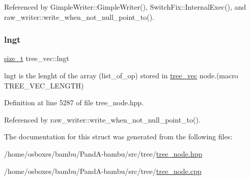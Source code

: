 Referenced by Gimple\+Writer\+::\+Gimple\+Writer(), Switch\+Fix\+::\+Internal\+Exec(), and raw\+\_\+writer\+::write\+\_\+when\+\_\+not\+\_\+null\+\_\+point\+\_\+to().

\mbox{\label{structtree__vec_a8edb7c8b48f7d0959584d92bc2c4385d}} 
\subsubsection{\texorpdfstring{lngt}{lngt}}
{\footnotesize\ttfamily \hyperlink{tutorial__fpt__2017_2intro_2sixth_2test_8c_a7c94ea6f8948649f8d181ae55911eeaf}{size\+\_\+t} tree\+\_\+vec\+::lngt}



lngt is the lenght of the array (list\+\_\+of\+\_\+op) stored in \hyperlink{structtree__vec}{tree\+\_\+vec} node.(macro T\+R\+E\+E\+\_\+\+V\+E\+C\+\_\+\+L\+E\+N\+G\+TH) 



Definition at line 5287 of file tree\+\_\+node.\+hpp.



Referenced by raw\+\_\+writer\+::write\+\_\+when\+\_\+not\+\_\+null\+\_\+point\+\_\+to().



The documentation for this struct was generated from the following files\+:\begin{DoxyCompactItemize}
\item 
/home/osboxes/bambu/\+Pand\+A-\/bambu/src/tree/\hyperlink{tree__node_8hpp}{tree\+\_\+node.\+hpp}\item 
/home/osboxes/bambu/\+Pand\+A-\/bambu/src/tree/\hyperlink{tree__node_8cpp}{tree\+\_\+node.\+cpp}\end{DoxyCompactItemize}
